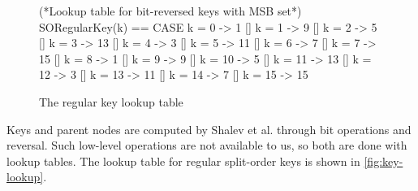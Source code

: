 \documentclass{uit-thesis}
\begin{document}
\begin{figure}
    \begin{tla}
        (*Lookup table for bit-reversed keys with MSB set*)
        SORegularKey(k) ==  CASE k = 0 -> 1
                            [] k = 1 -> 9
                            [] k = 2 -> 5
                            [] k = 3 -> 13
                            [] k = 4 -> 3
                            [] k = 5 -> 11
                            [] k = 6 -> 7
                            [] k = 7 -> 15
                            [] k = 8 -> 1
                            [] k = 9 -> 9
                            [] k = 10 -> 5
                            [] k = 11 -> 13
                            [] k = 12 -> 3
                            [] k = 13 -> 11
                            [] k = 14 -> 7
                            [] k = 15 -> 15
    \end{tla}
\begin{tlatex}
%
%
\@xx{}%
%
%
%
%
%
%
%
%
%
%
%
%
%
%
%
\end{tlatex}
    \caption{The regular key lookup table}
    \label{fig:key-lookup}
\end{figure}

Keys and parent nodes are computed by Shalev et al. through bit operations and reversal. Such low-level operations are not available to us, so both are done with lookup tables. The lookup table for regular split-order keys is shown in \autoref{fig:key-lookup}.
\end{document}
